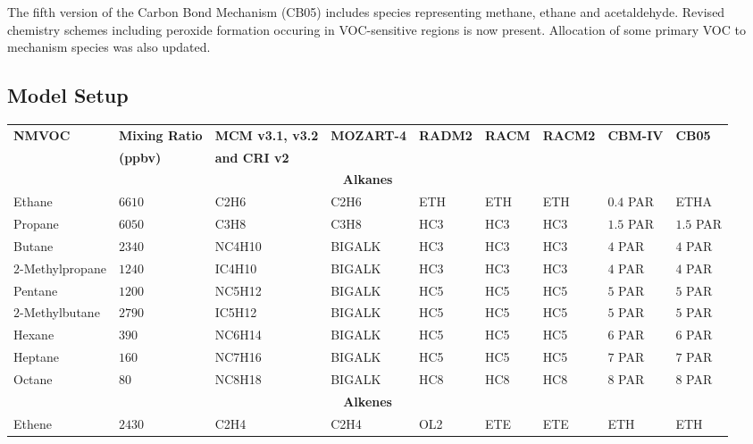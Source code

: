 The fifth version of the Carbon Bond Mechanism (CB05) \citep{Yarwood:2005} includes species representing methane, ethane and acetaldehyde. 
Revised chemistry schemes including peroxide formation occuring in VOC-sensitive regions is now present.
Allocation of some primary VOC to mechanism species was also updated.

\subsection{Model Setup} \label{ss:model_setup}

\begin{sidewaystable}
    \centering
    \begin{tabular}{lllllllll}
        \hline \hline
        \multirow{2}{*}{\textbf{NMVOC}} & \textbf{Mixing Ratio} & \textbf{MCM v3.1, v3.2} & \multirow{2}{*}{\textbf{MOZART-4}} & \multirow{2}{*}{\textbf{RADM2}} & \multirow{2}{*}{\textbf{RACM}} & \multirow{2}{*}{\textbf{RACM2}} & \multirow{2}{*}{\textbf{CBM-IV}} & \multirow{2}{*}{\textbf{CB05}}\\ & \textbf{(ppbv)} & \textbf{and CRI v2} & & & & & & \\ 
        \hline \hline \multicolumn{9}{c}{\textbf{Alkanes}}  \\ \hline
        Ethane & $6610$ & C2H6 & C2H6 & ETH & ETH & ETH & $0.4$ PAR & ETHA \\
        Propane  & $6050$ & C3H8 & C3H8 & HC3 & HC3 & HC3 & $1.5$ PAR & $1.5$ PAR \\
        Butane & $2340$ & NC4H10 & BIGALK & HC3 & HC3 & HC3 & $4$ PAR & $4$ PAR \\
        $2$-Methylpropane & $1240$ & IC4H10 & BIGALK & HC3 & HC3 & HC3 & $4$ PAR & $4$ PAR \\
        Pentane & $1200$ & NC5H12 & BIGALK & HC5 & HC5 & HC5 & $5$ PAR & $5$ PAR \\
        $2$-Methylbutane & $2790$ & IC5H12 & BIGALK & HC5 & HC5 & HC5 & $5$ PAR & $5$ PAR \\
        Hexane & $390$ & NC6H14 & BIGALK & HC5 & HC5 & HC5 & $6$ PAR & $6$ PAR \\
        Heptane & $160$ & NC7H16 &  BIGALK & HC5 & HC5 & HC5 & $7$ PAR & $7$ PAR \\
        Octane & $80$ & NC8H18 & BIGALK & HC8 & HC8 & HC8 & $8$ PAR & $8$ PAR \\ \hline 
        \multicolumn{9}{c}{\textbf{Alkenes}} \\ \hline
        Ethene & $2430$ & C2H4 & C2H4 & OL2 & ETE & ETE & ETH & ETH \\

\end{tabular}
\end{sidewaystable}
